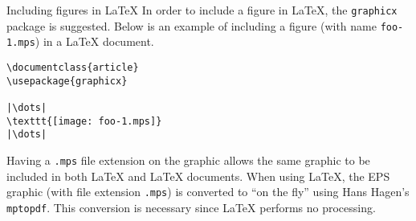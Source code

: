 \begin{section}{Including \MP{} figures in \LaTeX}
In order to include a \MP{} figure in \LaTeX{}, the \texttt{graphicx} package is suggested.  Below is an example of including a \MP{} figure (with name \texttt{foo-1.mps}) in a \LaTeX{} document.
\begin{lstlisting}[xleftmargin=17bp]
\documentclass{article}
\usepackage{graphicx}

|\dots|
\texttt{[image: foo-1.mps]}
|\dots|

\end{lstlisting}
Having a \verb|.mps| file extension on the graphic allows the same graphic to be included in both \LaTeX{} and \PDF\LaTeX{} documents.  When using \PDF\LaTeX, the EPS graphic (with file extension \verb|.mps|) is converted to \PDF{} ``on the fly'' using Hans Hagen's \texttt{mptopdf}.  This conversion is necessary since \PDF\LaTeX{} performs no \PS{} processing.
\end{section}
